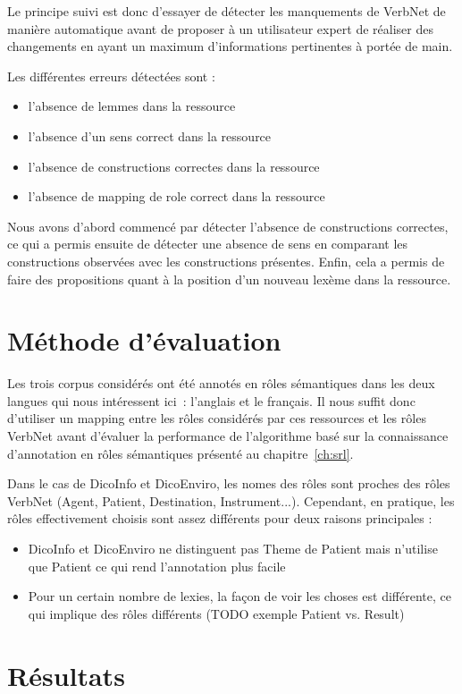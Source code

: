 Le principe suivi est donc d'essayer de détecter les manquements de VerbNet de
manière automatique avant de proposer à un utilisateur expert de réaliser des
changements en ayant un maximum d'informations pertinentes à portée de main.

Les différentes erreurs détectées sont :
\begin{itemize}
    \item l'absence de lemmes dans la ressource
    \item l'absence d'un sens correct dans la ressource
    \item l'absence de constructions correctes dans la ressource
    \item l'absence de mapping de role correct dans la ressource
\end{itemize}

Nous avons d'abord commencé par détecter l'absence de constructions correctes,
ce qui a permis ensuite de détecter une absence de sens en comparant les
constructions observées avec les constructions présentes. Enfin, cela a permis
de faire des propositions quant à la position d'un nouveau lexème dans la
ressource.

\section{Méthode d'évaluation}

Les trois corpus considérés ont été annotés en rôles sémantiques dans les deux
langues qui nous intéressent ici~: l'anglais et le français. Il nous suffit
donc d'utiliser un mapping entre les rôles considérés par ces ressources et les
rôles VerbNet avant d'évaluer la performance de l'algorithme basé sur la
connaissance d'annotation en rôles sémantiques présenté au
chapitre~\ref{ch:srl}.

Dans le cas de DicoInfo et DicoEnviro, les nomes des rôles sont proches des
rôles VerbNet (Agent, Patient, Destination, Instrument...). Cependant, en
pratique, les rôles effectivement choisis sont assez différents pour deux
raisons principales : 

\begin{itemize}
    \item DicoInfo et DicoEnviro ne distinguent pas Theme de Patient mais n'utilise que Patient ce qui rend l'annotation plus facile
    \item Pour un certain nombre de lexies, la façon de voir les choses est différente, ce qui implique des rôles différents (TODO exemple Patient vs. Result) %
\end{itemize}

\section{Résultats}
